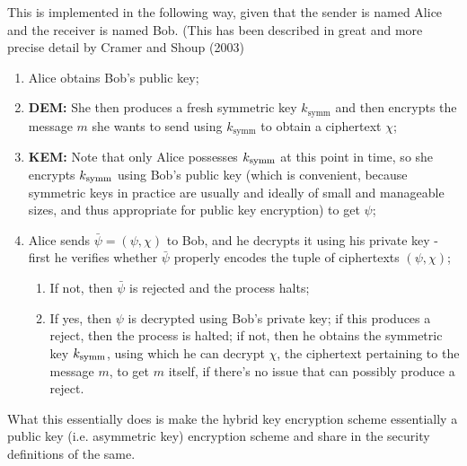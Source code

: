 This is implemented in the following way, given that the sender is named Alice and the receiver is named Bob. (This has been described in great and more precise detail by Cramer and Shoup (2003)\cite{cryptoeprint:2001:108}
\begin{enumerate}
\item Alice obtains Bob's public key;
\item \textbf{DEM:} She then produces a fresh symmetric key $k_\text{symm}$ and then encrypts the message $m$ she wants to send using $k_\text{symm}$ to obtain a ciphertext $\chi$;
\item \textbf{KEM:} Note that only Alice possesses $k_{\text{symm}}$ at this point in time, so she encrypts $k_{\text{symm}}$ using Bob's public key (which is convenient, because symmetric keys in practice are usually and ideally of small and manageable sizes, and thus appropriate for public key encryption) to get $\psi$;
\item Alice sends $\bar\psi=(\psi,\chi)$ to Bob, and he decrypts it using his private key - first he verifies whether $\bar\psi$ properly encodes the tuple of ciphertexts $(\psi,\chi)$;
\begin{enumerate}
\item If not, then $\bar\psi$ is rejected and the process halts;
\item If yes, then $\psi$ is decrypted using Bob's private key; if this produces a reject, then the process is halted; if not, then he obtains the symmetric key $k_{\text{symm}}$, using which he can decrypt $\chi$, the ciphertext pertaining to the message $m$, to get $m$ itself, if there's no issue that can possibly produce a reject.
\end{enumerate}
\end{enumerate}

What this essentially does is make the hybrid key encryption scheme essentially a public key (i.e. asymmetric key) encryption scheme and share in the security definitions of the same.
\label{sec:intro}
